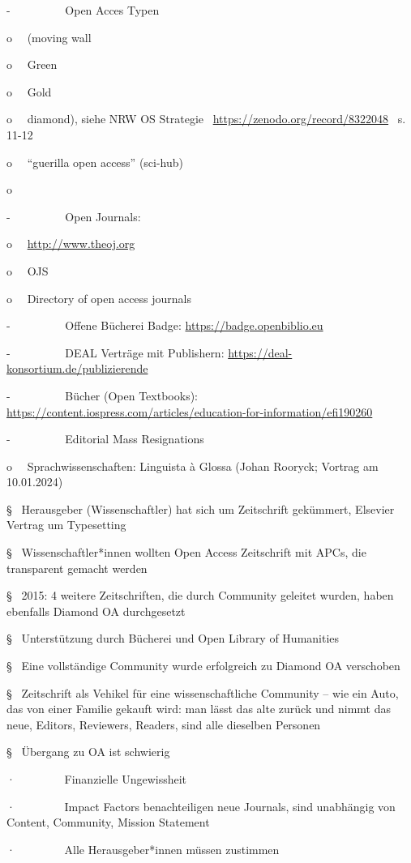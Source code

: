 \documentclass[
  letterpaper,
  DIV=11,
  numbers=noendperiod]{scrreprt}
\begin{document}
-~~~~~~~~~ Open Acces Typen

o~~ (moving wall

o~~ Green

o~~ Gold

o~~ diamond), siehe NRW OS Strategie
~\url{https://zenodo.org/record/8322048}~ s. 11-12

o~~ ``guerilla open access'' (sci-hub)

o~~

-~~~~~~~~~ Open Journals:

o~~ \url{http://www.theoj.org}

o~~ OJS

o~~ Directory of open access journals

-~~~~~~~~~ Offene Bücherei Badge: \url{https://badge.openbiblio.eu}

-~~~~~~~~~ DEAL Verträge mit Publishern:
\url{https://deal-konsortium.de/publizierende}

-~~~~~~~~~ Bücher (Open Textbooks):
\url{https://content.iospress.com/articles/education-for-information/efi190260}

-~~~~~~~~~ Editorial Mass Resignations

o~~ Sprachwissenschaften: Linguista à Glossa (Johan Rooryck; Vortrag am
10.01.2024)

§~ Herausgeber (Wissenschaftler) hat sich um Zeitschrift gekümmert,
Elsevier Vertrag um Typesetting

§~ Wissenschaftler*innen wollten Open Access Zeitschrift mit APCs, die
transparent gemacht werden

§~ 2015: 4 weitere Zeitschriften, die durch Community geleitet wurden,
haben ebenfalls Diamond OA durchgesetzt

§~ Unterstützung durch Bücherei und Open Library of Humanities

§~ Eine vollständige Community wurde erfolgreich zu Diamond OA
verschoben

§~ Zeitschrift als Vehikel für eine wissenschaftliche Community -- wie
ein Auto, das von einer Familie gekauft wird: man lässt das alte zurück
und nimmt das neue, Editors, Reviewers, Readers, sind alle dieselben
Personen

§~ Übergang zu OA ist schwierig

·~~~~~~~~ Finanzielle Ungewissheit

·~~~~~~~~ Impact Factors benachteiligen neue Journals, sind unabhängig
von Content, Community, Mission Statement

·~~~~~~~~ Alle Herausgeber*innen müssen zustimmen
\end{document}
